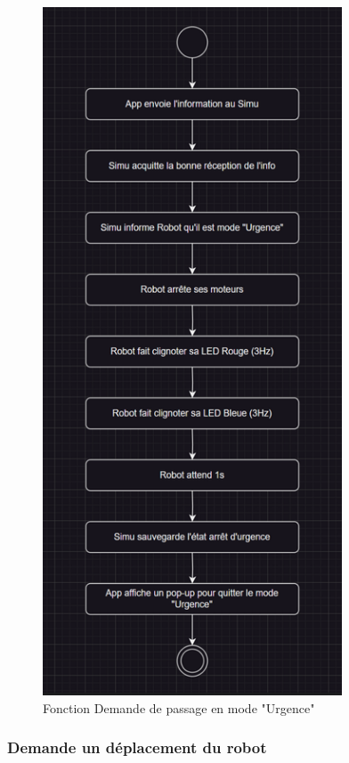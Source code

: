 \begin{figure}[H]
    \centering
    \includegraphics[scale=0.5]{data/function1.png}
    \caption{Fonction Demande de passage en mode "Urgence"}
    \label{fig:ihm_emergency}
    \end{figure}

\subsubsection{Demande un déplacement du robot}

